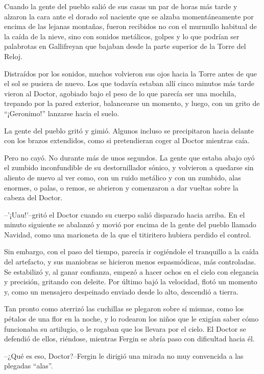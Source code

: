 Cuando la gente del pueblo salió de sus casas un par de horas más tarde y alzaron la cara ante el dorado sol naciente que se alzaba momentáneamente por encima de las lejanas montañas, fueron recibidos no con el murmullo habitual de la caída de la nieve, sino con sonidos metálicos, golpes y lo que podrían ser palabrotas en Gallifreyan que bajaban desde la parte superior de la Torre del Reloj.

Distraídos por los sonidos, muchos volvieron sus ojos hacia la Torre antes de que el sol se pusiera de nuevo. Los que todavía estaban allí cinco minutos más tarde vieron al Doctor, agobiado bajo el peso de lo que parecía ser una mochila, trepando por la pared exterior, balancearse un momento, y luego, con un grito de ``¡Geronimo!'' lanzarse hacia el suelo.

La gente del pueblo gritó y gimió. Algunos incluso se precipitaron hacia delante con los brazos extendidos, como si pretendieran coger al Doctor mientras caía.

Pero no cayó. No durante más de unos segundos. La gente que estaba abajo oyó el zumbido inconfundible de su destornillador sónico, y volvieron a quedarse sin aliento de nuevo al ver como, con un ruido metálico y con un zumbido, alas enormes, o palas, o remos, se abrieron y comenzaron a dar vueltas sobre la cabeza del Doctor.

--'¡Uau!'--gritó el Doctor cuando su cuerpo salió disparado hacia arriba. En el minuto siguiente se abalanzó y movió por encima de la gente del pueblo llamado Navidad, como una marioneta de la que el titiritero hubiera perdido el control.

Sin embargo, con el paso del tiempo, parecía ir cogiéndole el tranquillo a la caída del artefacto, y sus maniobras se hicieron menos espasmódicas, más controladas. Se estabilizó y, al ganar confianza, empezó a hacer ochos en el cielo con elegancia y precisión, gritando con deleite. Por último bajó la velocidad, flotó un momento y, como un mensajero despeinado enviado desde lo alto, descendió a tierra.

Tan pronto como aterrizó las cuchillas se plegaron sobre sí mismas, como los pétalos de una flor en la noche, y lo rodearon los niños que le exigían saber cómo funcionaba su artilugio, o le rogaban que los llevara por el cielo. El Doctor se defendió de ellos, riéndose, mientras Fergin se abría paso con dificultad hacia él.

--¿Qué es eso, Doctor?--Fergin le dirigió una mirada no muy convencida a las plegadas ``alas''.

